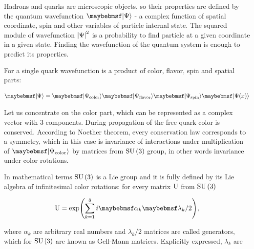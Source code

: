 Hadrons and quarks are microscopic objects, so their properties are defined by
the quantum wavefunction $\ket{\Psi}$ - a complex function of spatial
coordinate, spin and other variables of particle internal state. The squared
module of wavefunction $\left\lvert{\Psi}\right\rvert^2$ is a probability to find particle at a
given coordinate in a given state. Finding the wavefunction of the quantum
system is enough to predict its properties.

For a single quark wavefunction is a product of color, flavor, spin and spatial
parts:

\begin{equation}
  \ket{\Psi} = \ket{\Psi_{\mathrm{color}}} \ket{\Psi_{\mathrm{flavor}}}
               \ket{\Psi_{\mathrm{spin}}}  \ket{\Psi(x)}
\end{equation}

Let us concentrate on the color part, which can be represented as
a complex vector with 3 components. During propagation of the free quark color
is conserved. According to Noether theorem, every conservation law corresponds
to a symmetry, which in this case is invariance of interactions under
multiplication of $\ket{\Psi_{\mathrm{color}}}$ by matrices from $\mathrm{SU}\left({3}\right)$
group, in other words invariance under color rotations.

In mathematical terms $\mathrm{SU}\left({3}\right)$ is a Lie group and it is fully defined by
its Lie algebra of infinitesimal color rotations: for every matrix $\mathrm{U}$ from
$\mathrm{SU}\left({3}\right)$

\begin{equation}
  \U = \expOf{\sum_{k = 1}^8 i \alpha_k \lambda_k/2} ,
\end{equation}

where $\alpha_k$ are arbitrary real numbers and $\lambda_k/2$ matrices are
called generators, which for $\mathrm{SU}\left({3}\right)$ are known as Gell-Mann matrices.
Explicitly expressed, $\lambda_k$ are

